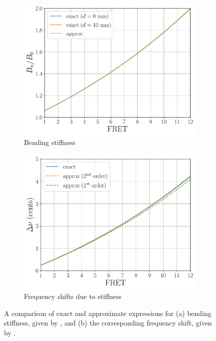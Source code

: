 \begin{figure}
  \centering
  \begin{subfigure}[b]{0.8\textwidth}
      \centering
      \includegraphics[width=5.0in]{figures/bn_test}
      \caption{Bending stiffness}
      \label{fig:bn_test}
  \end{subfigure}
  \par\vspace{0.25in}
  \begin{subfigure}[b]{0.8\textwidth}
      \centering
      \includegraphics[width=5.0in]{figures/bnu_test}
      \caption{Frequency shifts due to stiffness}
      \label{fig:bnu_test}
  \end{subfigure}
  \caption{\label{fig:stiffness_test} A comparison of exact and approximate expressions for (a) bending stiffness, given by , and (b) the corresponding frequency shift, given by .}
\end{figure}

